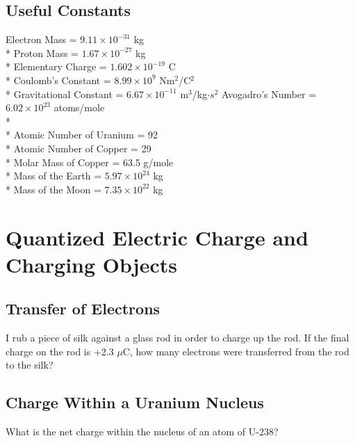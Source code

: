 \documentclass[11pt]{article}
\begin{document}
\maketitle
\tableofcontents
\vspace{50pt}

\subsection*{Useful Constants}
Electron Mass = $9.11 \times 10^{-31}$ kg \\*
Proton Mass = $1.67 \times 10^{-27}$ kg \\*
Elementary Charge = $1.602 \times 10^{-19}$ C \\*
Coulomb's Constant = $8.99 \times 10^9$ Nm$^2$/C$^2$ \\*
Gravitational Constant = $6.67 \times 10^{-11}$ m$^3$/kg$\cdot s^2$
Avogadro's Number = $ 6.02 \times 10^{23}$ atoms/mole \\*\\*
Atomic Number of Uranium = 92 \\*
Atomic Number of Copper = 29 \\*
Molar Mass of Copper = 63.5 g/mole \\*
Mass of the Earth = $5.97 \times 10^{24}$ kg\\*
Mass of the Moon = $7.35 \times 10^{22}$ kg


\pagebreak
\section{Quantized Electric Charge and Charging Objects}
\vspace{10pt}

\subsection{Transfer of Electrons}
I rub a piece of silk against a glass rod in order to charge up the rod.  If the final charge on the rod is +2.3 $\mu$C, how many electrons were transferred from the rod to the silk?

\subsection{Charge Within a Uranium Nucleus}
What is the net charge within the nucleus of an atom of U-238?
\end{document}
